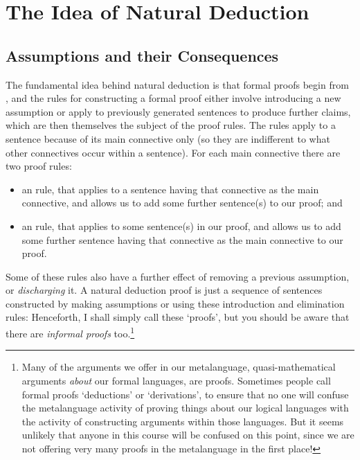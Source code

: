 \chapter{The Idea of Natural Deduction}\label{c:ass}

\section{Assumptions and their Consequences}

The fundamental idea behind natural deduction is that formal proofs begin from , and the rules for constructing a formal proof either involve introducing a new assumption or apply to previously generated sentences to produce further claims, which are then themselves the subject of the proof rules. The rules apply to a sentence because of its main connective only (so they are indifferent to what other connectives occur within a sentence). For each main connective there are two proof rules:
\begin{itemize}
 	\item an  rule, that applies to a sentence having that connective as the main connective, and allows us to add some further sentence(s) to our proof; and
 	\item an  rule, that applies to some sentence(s) in our proof, and allows us to add some further sentence having that connective as the main connective to our proof. 
 \end{itemize} Some of these rules also have a further effect of removing a previous assumption, or \emph{discharging} it. A natural deduction proof is just a sequence of sentences constructed by making assumptions or using these introduction and elimination rules:
 Henceforth, I shall simply call these `proofs', but you should be aware that there are \emph{informal proofs} too.\footnote{Many of the arguments we offer in our metalanguage, quasi-mathematical arguments \emph{about} our formal languages, are proofs. Sometimes people call formal proofs `deductions' or `derivations', to ensure that no one will confuse the metalanguage activity of proving things about our logical languages with the activity of constructing arguments within those languages. But it seems unlikely that anyone in this course will be confused on this point, since we are not offering very many proofs in the metalanguage in the first place!}

